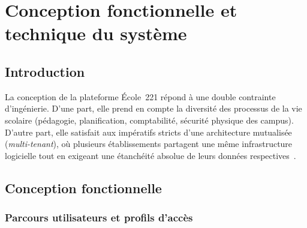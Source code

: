 \chapter{Conception fonctionnelle et technique du système}

\section{Introduction}

La conception de la plateforme École~221 répond à une double contrainte d'ingénierie. D'une part, elle prend en compte la diversité des processus de la vie scolaire (pédagogie, planification, comptabilité, sécurité physique des campus). D'autre part, elle satisfait aux impératifs stricts d'une architecture mutualisée (\emph{multi-tenant}), où plusieurs établissements partagent une même infrastructure logicielle tout en exigeant une étanchéité absolue de leurs données respectives~\cite{chong2006saas}.

\section{Conception fonctionnelle}

\subsection{Parcours utilisateurs et profils d'accès}

